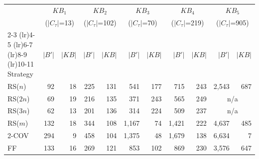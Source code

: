 \begin{tabular}{lrrrrrrrrrr}
\toprule
 & \multicolumn{2}{c}{$KB_1$} & \multicolumn{2}{c}{$KB_2$} & \multicolumn{2}{c}{$KB_3$} & \multicolumn{2}{c}{$KB_4$} & \multicolumn{2}{c}{$KB_5$} \\
 & \multicolumn{2}{c}{($|C_\tau|$=13)} & \multicolumn{2}{c}{($|C_\tau|$=102)} & \multicolumn{2}{c}{($|C_\tau|$=70)} & \multicolumn{2}{c}{($|C_\tau|$=219)} & \multicolumn{2}{c}{($|C_\tau|$=905)} \\
\cmidrule(lr){2-3} \cmidrule(lr){4-5} \cmidrule(lr){6-7} \cmidrule(lr){8-9} \cmidrule(lr){10-11}
Strategy & $|B'|$ & $|KB|$ & $|B'|$ & $|KB|$ & $|B'|$ & $|KB|$ & $|B'|$ & $|KB|$ & $|B'|$ & $|KB|$ \\
\midrule
RS($n$) & 92 & 18 & 225 & 131 & 541 & 177 & 715 & 243 & 2{,}543 & 687 \\
RS($2n$) & 69 & 19 & 216 & 135 & 371 & 243 & 565 & 249 & \multicolumn{2}{c}{n/a} \\
RS($3n$) & 62 & 13 & 201 & 136 & 314 & 224 & 509 & 237 & \multicolumn{2}{c}{n/a} \\
RS($m$) & 132 & 18 & 344 & 108 & 1{,}167 & 74 & 1{,}421 & 222 & 4{,}637 & 485 \\
2-COV & 294 & 9 & 458 & 104 & 1{,}375 & 48 & 1{,}679 & 138 & 6{,}634 & 7 \\
FF & 133 & 16 & 269 & 121 & 853 & 102 & 869 & 230 & 3{,}576 & 647 \\
\bottomrule
\end{tabular}
